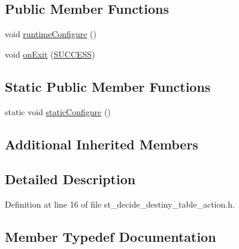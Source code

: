 \subsection*{Public Member Functions}
\begin{DoxyCompactItemize}
\item 
void \hyperlink{structsm__fetch__two__table__whiskey__pour_1_1StDecideDestinyTableAction_a60c5005c866be4814523f689c27bb7e6}{runtime\+Configure} ()
\item 
void \hyperlink{structsm__fetch__two__table__whiskey__pour_1_1StDecideDestinyTableAction_a088ea012849bd31e47f417af511efcdb}{on\+Exit} (\hyperlink{structsmacc_1_1default__transition__tags_1_1SUCCESS}{S\+U\+C\+C\+E\+SS})
\end{DoxyCompactItemize}
\subsection*{Static Public Member Functions}
\begin{DoxyCompactItemize}
\item 
static void \hyperlink{structsm__fetch__two__table__whiskey__pour_1_1StDecideDestinyTableAction_a64d068f29a968f77b883167301008221}{static\+Configure} ()
\end{DoxyCompactItemize}
\subsection*{Additional Inherited Members}


\subsection{Detailed Description}


Definition at line 16 of file st\+\_\+decide\+\_\+destiny\+\_\+table\+\_\+action.\+h.



\subsection{Member Typedef Documentation}
\mbox{\label{structsm__fetch__two__table__whiskey__pour_1_1StDecideDestinyTableAction_a34401c5a7f88b98f4d85e274dc26de4b}} 
